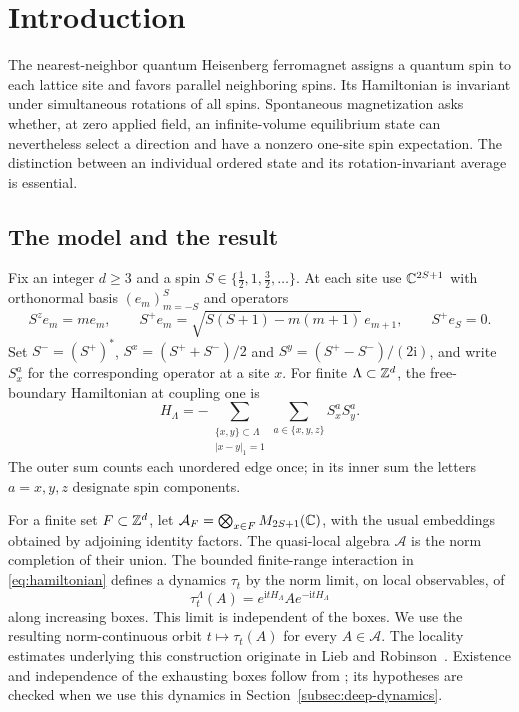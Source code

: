 \section{Introduction}\label{sec:introduction}

The nearest-neighbor quantum Heisenberg ferromagnet assigns a quantum spin
to each lattice site and favors parallel neighboring spins.  Its Hamiltonian
is invariant under simultaneous rotations of all spins.  Spontaneous
magnetization asks whether, at zero applied field, an infinite-volume
equilibrium state can nevertheless select a direction and have a nonzero
one-site spin expectation.  The distinction between an individual ordered
state and its rotation-invariant average is essential.

\subsection{The model and the result}\label{sec:model}

Fix an integer $d\geq3$ and a spin
$S\in\{\frac12,1,\frac32,\ldots\}$.  At each site use $\mathbb C^{2S+1}$ with
orthonormal basis $(e_m)_{m=-S}^{S}$ and operators
\[
 S^z e_m=m e_m,\qquad
 S^+e_m=\sqrt{S(S+1)-m(m+1)}\,e_{m+1},\qquad S^+e_S=0.
\]
Set $S^-=(S^+)^*$, $S^x=(S^++S^-)/2$ and
$S^y=(S^+-S^-)/(2\mathrm i)$, and write $S_x^a$ for the corresponding
operator at a site $x$.  For finite $\Lambda\subset\mathbb Z^d$, the free-boundary
Hamiltonian at coupling one is
\begin{equation}\label{eq:hamiltonian}
 H_\Lambda
 =-\sum_{\substack{\{x,y\}\subset\Lambda\\|x-y|_1=1}}
       \sum_{a\in\{x,y,z\}} S_x^aS_y^a.
\end{equation}
The outer sum counts each unordered edge once; in its inner sum the
letters $a=x,y,z$ designate spin components.

For a finite set $F\subset\mathbb Z^d$, let
$\mathcal A_F=\bigotimes_{x\in F}M_{2S+1}(\mathbb C)$, with the usual embeddings
obtained by adjoining identity factors.  The quasi-local algebra
$\mathcal A$ is the norm completion of their union.  The bounded
finite-range interaction in \eqref{eq:hamiltonian} defines a dynamics
$\tau_t$ by the norm limit, on local observables, of
\[
 \tau_t^\Lambda(A)=e^{\mathrm itH_\Lambda}A e^{-\mathrm itH_\Lambda}
\]
along increasing boxes.  This limit is independent of the boxes.
We use the resulting norm-continuous orbit $t\mapsto\tau_t(A)$ for every
$A\in\mathcal A$.  The locality estimates underlying this construction originate in
Lieb and Robinson~\cite{LiebRobinson1972}.  Existence and independence of the exhausting boxes follow from
\cite[Theorem~2.2]{NachtergaeleOgataSims2006}; its hypotheses are checked
when we use this dynamics in Section~\ref{subsec:deep-dynamics}.

